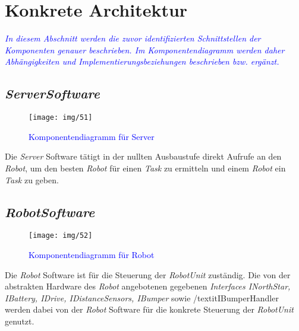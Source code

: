 \section{Konkrete Architektur}
\textcolor{blue}{\textit{In diesem Abschnitt werden die zuvor identifizierten Schnittstellen der Komponenten genauer beschrieben. Im Komponentendiagramm werden daher Abhängigkeiten und Implementierungsbeziehungen beschrieben bzw. ergänzt.
}}
\subsection{\textit{ServerSoftware}}
\begin{figure}[H]
\centering
\texttt{[image: img/51]}
\caption{\textcolor{blue}{Komponentendiagramm für Server}}
\label{KomponentendiagrammKonkret}
\end{figure}
Die \textit{Server} Software tätigt in der nullten Ausbaustufe direkt Aufrufe an den \textit{Robot}, 
um den besten \textit{Robot} für einen \textit{Task} zu ermitteln und einem \textit{Robot} ein \textit{Task} zu geben.

\subsection{\textit{RobotSoftware}}
\begin{figure}[H]
	\centering
	\texttt{[image: img/52]}
	\caption{\textcolor{blue}{Komponentendiagramm für Robot}}
	\label{KomponentendiagrammKonkret}
\end{figure}
Die \textit{Robot} Software ist für die Steuerung der \textit{RobotUnit} zuständig. Die von der abstrakten Hardware 
des \textit{Robot} angebotenen gegebenen \textit{Interfaces INorthStar, IBattery, IDrive, IDistanceSensors, IBumper} sowie 
/textit{IBumperHandler} werden dabei von der \textit{Robot} Software für die konkrete Steuerung der \textit{RobotUnit} genutzt.
